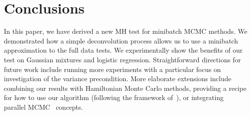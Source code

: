 \documentclass{article}
\begin{document}


\section{Conclusions}\label{sec:conclusion}

In this paper, we have derived a new MH test for minibatch MCMC methods. We demonstrated how a
simple deconvolution process allows us to use a minibatch approximation to the full data tests. We
experimentally show the benefits of our test on Gaussian mixtures and logistic regression.
Straightforward directions for future work include running more experiments with a
particular focus on investigation of the variance precondition.  More elaborate extensions include
combining our results with Hamiltonian Monte Carlo methods, providing a recipe for how to use our
algorithm (following the framework of~\cite{sgmcmc_2015}), or integrating parallel
MCMC~\cite{conf/uai/AngelinoKWSA14,conf/icml/AhnSW14} concepts.
\end{document}

